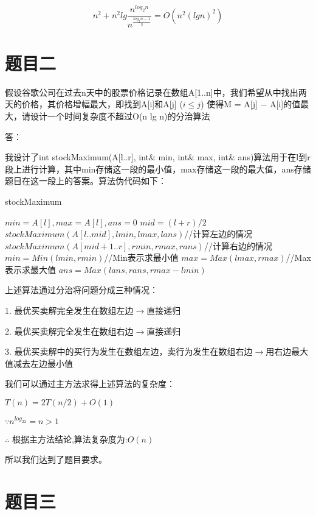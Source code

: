 \documentclass[UTF8]{ctexart}
\begin{document}
$$
n^2 +  n^2lg\frac{n^{log_2n}}{n^{\frac{log_2n - 1}{2}}} = O(n^2{(lgn)}^2)
$$



\quad 

\section{题目二}

假设谷歌公司在过去n天中的股票价格记录在数组A[1..n]中，我们希望从中找出两天的价格，其价格增幅最大，即找到A[i]和A[j] ($i \le j$) 使得M = A[j] − A[i]的值最大，请设计一个时间复杂度不超过O(n lg n)的分治算法

\noindent 答：

我设计了int stockMaximum(A[l..r], int\& min, int\& max, int\& ans)算法用于在l到r段上进行计算，其中min存储这一段的最小值，max存储这一段的最大值，ans存储题目在这一段上的答案。算法伪代码如下：

\begin{algorithm}[h]
  \caption{stockMaximum}
  \begin{algorithmic}[1]
  \STATE $min = A[l], max = A[l], ans = 0$
  \ELSE
  \STATE $mid = (l + r) / 2$
  \STATE $stockMaximum(A[l..mid], lmin, lmax, lans)$//计算左边的情况
  \STATE $stockMaximum(A[mid + 1..r], rmin, rmax, rans)$//计算右边的情况
  \STATE $min = Min(lmin, rmin)$//Min表示求最小值
  \STATE $max = Max(lmax, rmax)$//Max表示求最大值
  \STATE $ans = Max(lans, rans, rmax - lmin)$
  \ENDIF
  \end{algorithmic}
\end{algorithm}

上述算法通过分治将问题分成三种情况：

1. 最优买卖解完全发生在数组左边$\rightarrow$直接递归

2. 最优买卖解完全发生在数组右边$\rightarrow$直接递归

3. 最优买卖解中的买行为发生在数组左边，卖行为发生在数组右边$\rightarrow$用右边最大值减去左边最小值

我们可以通过主方法求得上述算法的复杂度：

$T(n) = 2T(n/2) + O(1)$

$\because n^{log_22} = n > 1$

$\therefore$ 根据主方法结论,算法复杂度为:$O(n)$

所以我们达到了题目要求。

\section{题目三}
\end{document}
